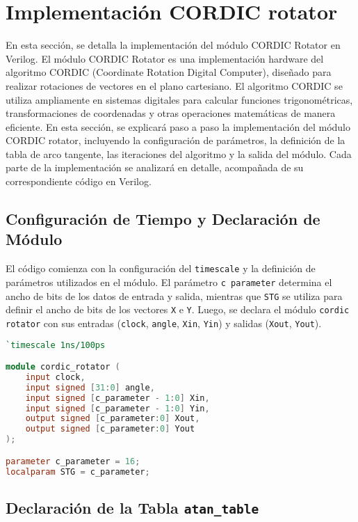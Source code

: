 \documentclass[12pt,a4paper, twoside]{article} %
\begin{document}
\newpage

\section{Implementación CORDIC rotator}
\label{sec:orgc1c4017}

En esta sección, se detalla la implementación del módulo CORDIC Rotator en Verilog. El módulo CORDIC Rotator es una implementación hardware del algoritmo CORDIC (Coordinate Rotation Digital Computer), diseñado para realizar rotaciones de vectores en el plano cartesiano. El algoritmo CORDIC se utiliza ampliamente en sistemas digitales para calcular funciones trigonométricas, transformaciones de coordenadas y otras operaciones matemáticas de manera eficiente. En esta sección, se explicará paso a paso la implementación del módulo CORDIC rotator, incluyendo la configuración de parámetros, la definición de la tabla de arco tangente, las iteraciones del algoritmo y la salida del módulo. Cada parte de la implementación se analizará en detalle, acompañada de su correspondiente código en Verilog.

\subsection{Configuración de Tiempo y Declaración de Módulo}

El código comienza con la configuración del \texttt{timescale} y la definición de parámetros utilizados en el módulo. El parámetro \texttt{c parameter} determina el ancho de bits de los datos de entrada y salida, mientras que \texttt{STG} se utiliza para definir el ancho de bits de los vectores \texttt{X} e \texttt{Y}. Luego, se declara el módulo \texttt{cordic rotator} con sus entradas (\texttt{clock}, \texttt{angle}, \texttt{Xin}, \texttt{Yin}) y salidas (\texttt{Xout}, \texttt{Yout}).

\begin{lstlisting}[language=Verilog]
`timescale 1ns/100ps

module cordic_rotator (
    input clock,
    input signed [31:0] angle,
    input signed [c_parameter - 1:0] Xin,
    input signed [c_parameter - 1:0] Yin,
    output signed [c_parameter:0] Xout,
    output signed [c_parameter:0] Yout
);

parameter c_parameter = 16;
localparam STG = c_parameter;
\end{lstlisting}

\subsection{Declaración de la Tabla \texttt{atan\_table}}
\end{document}
